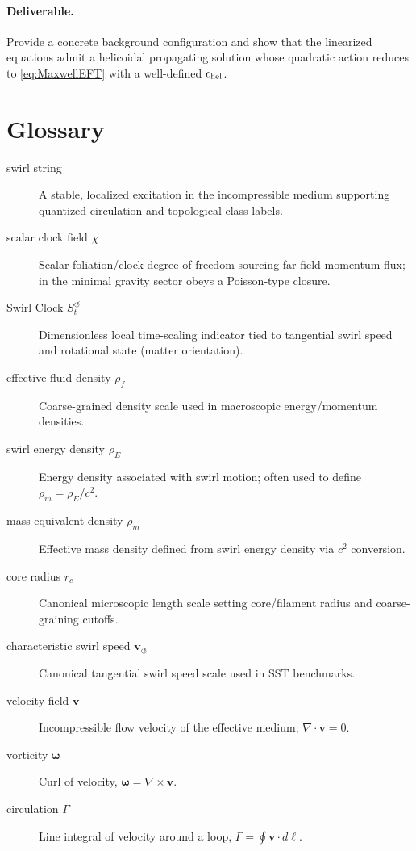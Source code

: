 \documentclass[10pt]{article}
\begin{document}
\paragraph{Deliverable.}
Provide a concrete background configuration and show that the linearized equations admit a helicoidal propagating solution
whose quadratic action reduces to \eqref{eq:MaxwellEFT} with a well-defined $c_{\rm hel}$.


\section{Glossary}
\label{sec:v076-glossary}

\begin{description}
\item[swirl string] A stable, localized excitation in the incompressible medium supporting quantized circulation and topological class labels.
\item[scalar clock field $\chi$] Scalar foliation/clock degree of freedom sourcing far-field momentum flux; in the minimal gravity sector obeys a Poisson-type closure.
\item[Swirl Clock $S_t^{\boldsymbol{\circlearrowleft}}$] Dimensionless local time-scaling indicator tied to tangential swirl speed and rotational state (matter orientation).
\item[effective fluid density $\rho_{\!f}$] Coarse-grained density scale used in macroscopic energy/momentum densities.
\item[swirl energy density $\rho_{\!E}$] Energy density associated with swirl motion; often used to define $\rho_{\!m}=\rho_{\!E}/c^2$.
\item[mass-equivalent density $\rho_{\!m}$] Effective mass density defined from swirl energy density via $c^2$ conversion.
\item[core radius $r_c$] Canonical microscopic length scale setting core/filament radius and coarse-graining cutoffs.
\item[characteristic swirl speed $\mathbf{v}_{\!\boldsymbol{\circlearrowleft}}$] Canonical tangential swirl speed scale used in SST benchmarks.
\item[velocity field $\mathbf{v}$] Incompressible flow velocity of the effective medium; $\nabla\cdot\mathbf{v}=0$.
\item[vorticity $\boldsymbol{\omega}$] Curl of velocity, $\boldsymbol{\omega}=\nabla\times\mathbf{v}$.
\item[circulation $\Gamma$] Line integral of velocity around a loop, $\Gamma=\oint \mathbf{v}\cdot d\boldsymbol{\ell}$.

\end{description}
\end{document}
